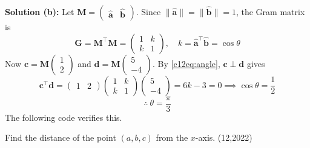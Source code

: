 \textbf{Solution (b):} Let $\mathbf{M} = \begin{pmatrix} \hat{\mathbf{a}} & \hat{\mathbf{b}} \end{pmatrix}$. Since $\|\hat{\mathbf{a}}\| = \|\hat{\mathbf{b}}\| = 1$, the Gram matrix is
\begin{equation}
\mathbf{G} = \mathbf{M}^{\top}\mathbf{M} = \begin{pmatrix} 1 & k \\ k & 1 \end{pmatrix}, \quad k = \hat{\mathbf{a}}^{\top}\hat{\mathbf{b}} = \cos\theta
\end{equation}
Now $\mathbf{c} = \mathbf{M}\begin{pmatrix} 1 \\ 2 \end{pmatrix}$ and $\mathbf{d} = \mathbf{M}\begin{pmatrix} 5 \\ -4 \end{pmatrix}$. By \eqref{c12eq:angle}, $\mathbf{c}\perp\mathbf{d}$ gives
\begin{equation}
\mathbf{c}^{\top}\mathbf{d} = \begin{pmatrix} 1 & 2 \end{pmatrix}
\begin{pmatrix} 1 & k \\ k & 1 \end{pmatrix}
\begin{pmatrix} 5 \\ -4 \end{pmatrix}
= 6k - 3 = 0 \implies \cos\theta = \frac{1}{2}
\end{equation}
\begin{equation}
\therefore\ \theta = \frac{\pi}{3}
\end{equation}
The following code verifies this.

\nopagebreak[4]
\begin{center}
\end{center}


\item Find the distance of the point $(a, b, c)$ from the $x$-axis. \hfill (12,2022)

